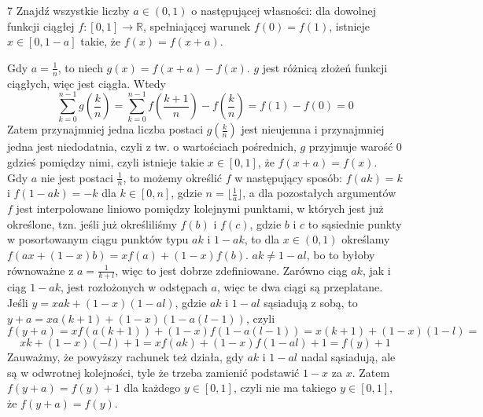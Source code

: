 \documentclass{../note}
\begin{document}
\begin{zadanie}{7}
Znajdź wszystkie liczby $a\in(0,1)$ o następującej własności: dla dowolnej funkcji ciągłej $f:[0,1]\rightarrow\mathbb{R}$, spełniającej warunek $f(0)=f(1)$, istnieje $x\in[0,1-a]$ takie, że $f(x)=f(x+a).$
\end{zadanie}
\begin{rozwiazanie}
Gdy $a = \frac1n$, to niech $g(x) = f(x + a) - f(x)$. $g$ jest różnicą złożeń funkcji ciągłych, więc jest ciągła. Wtedy 
\[\sum_{k=0}^{n-1} g\left(\frac{k}{n}\right) = \sum_{k=0}^{n-1} f\left(\frac{k+1}{n}\right) - f\left(\frac{k}{n}\right) = f(1) - f(0) = 0\]
Zatem przynajmniej jedna liczba postaci $g\left(\frac{k}{n}\right)$ jest nieujemna i przynajmniej jedna jest niedodatnia, czyli z tw. o wartościach pośrednich, $g$ przyjmuje warość 0 gdzieś pomiędzy nimi, czyli istnieje takie $x\in [0, 1]$, że $f(x+a) = f(x)$.\\
Gdy $a$ nie jest postaci $\frac1n$, to możemy określić $f$ w następujący sposób: $f(ak) = k$ i $f(1-ak) = -k$ dla $k \in [0, n]$, gdzie $n = \lfloor\frac1a\rfloor$, a dla pozostałych argumentów $f$ jest interpolowane liniowo pomiędzy kolejnymi punktami, w których jest już określone, tzn. jeśli już określiliśmy $f(b)$ i $f(c)$, gdzie $b$ i $c$ to sąsiednie punkty w posortowanym ciągu punktów typu $ak$ i $1 - ak$, to dla $x \in (0, 1)$ określamy $f(ax + (1-x)b) = xf(a) + (1-x)f(b)$. $ak \neq 1 - al$, bo to byłoby równoważne z $a = \frac{1}{k+l}$, więc to jest dobrze zdefiniowane. Zarówno ciąg $ak$, jak i ciąg $1 - ak$, jest rozłożonych w odstępach $a$, więc te dwa ciągi są przeplatane. Jeśli $y = xak + (1-x)(1-al)$, gdzie $ak$ i $1-al$ sąsiadują z sobą, to $y + a = xa(k+1) + (1-x)(1-a(l-1))$, czyli
\[f(y + a) = xf(a(k+1)) + (1-x)f(1-a(l-1)) = x(k+1) + (1-x)(1-l) =\]\[ xk + (1-x)(-l) + 1 = xf(ak) + (1-x)f(1-al) + 1 = f(y) + 1\]
Zauważmy, że powyższy rachunek też działa, gdy $ak$ i $1-al$ nadal sąsiadują, ale są w odwrotnej kolejności, tyle że trzeba zamienić podstawić $1-x$ za $x$. Zatem $f(y + a) = f(y) + 1$ dla każdego $y \in [0, 1]$, czyli nie ma takiego $y \in [0, 1]$, że $f(y+a) = f(y)$.
\end{rozwiazanie}
\end{document}
